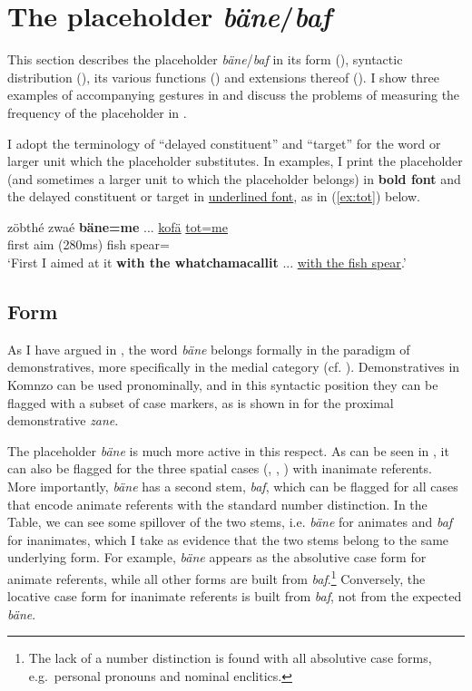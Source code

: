 \documentclass[output=paper,colorlinks,citecolor=brown]{langscibook}
\begin{document}
\section{The placeholder \textit{bäne}/\textit{baf}}\label{sec:doehler:bane}

This section describes the placeholder \textit{bäne}/\textit{baf} in its form (), syntactic distribution (), its various functions () and extensions thereof (). I show three examples of accompanying gestures in  and discuss the problems of measuring the frequency of the placeholder in .

I adopt the terminology of ``delayed constituent'' and ``target'' for the word or larger unit which the placeholder substitutes. In examples, I print the placeholder (and sometimes a larger unit to which the placeholder belongs) in \textbf{bold font} and the delayed constituent or target in \uline{underlined font}, as in (\ref{ex:tot}) below.

\ea \label{ex:tot}
    \gll zöbthé zwaé \textbf{bäne=me} ... \uline{kofä} \uline{tot=me}\\
    first aim  (280ms) fish spear=\\
    \glt `First I aimed at it \textbf{with the whatchamacallit} ... \uline{with the fish spear}.' 
\z

\subsection{Form}\label{sec:doehler:baneform}

As I have argued in , the word \textit{bäne} belongs formally in the paradigm of demonstratives, more specifically in the medial category (cf. ). Demonstratives in Komnzo can be used pronominally, and in this syntactic position they can be flagged with a subset of case markers, as is shown in  for the proximal demonstrative \textit{zane}.

The placeholder \textit{bäne} is much more active in this respect. As can be seen in , it can also be flagged for the three spatial cases (, , ) with inanimate referents. More importantly, \textit{bäne} has a second stem, \textit{baf}, which can be flagged for all cases that encode animate referents with the standard number distinction. In the Table, we can see some spillover of the two stems, i.e. \textit{bäne} for animates and \textit{baf} for inanimates, which I take as evidence that the two stems belong to the same underlying form. For example, \textit{bäne} appears as the absolutive case form for animate referents, while all other forms are built from \textit{baf}.\footnote{The lack of a number distinction is found with all absolutive case forms, e.g.\ personal pronouns and nominal enclitics.} Conversely, the locative case form for inanimate referents is built from \textit{baf}, not from the expected \textit{bäne}.
\end{document}
